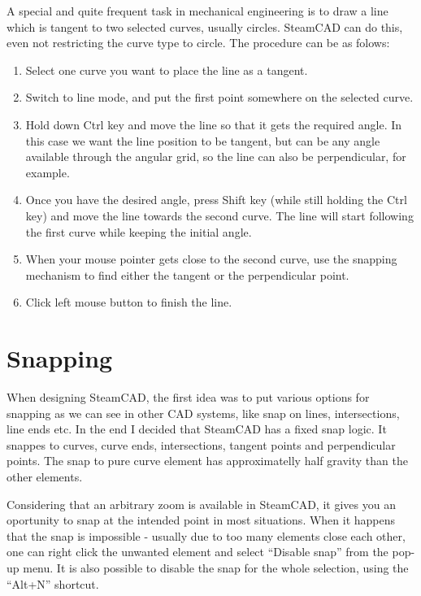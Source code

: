 A special and quite frequent task in mechanical engineering is to draw a line which is tangent
to two selected curves, usually circles. SteamCAD can do this, even not restricting the curve
type to circle. The procedure can be as folows:
\begin{enumerate}
\item Select one curve you want to place the line as a tangent.
\item Switch to line mode, and put the first point somewhere on the selected curve.
\item Hold down Ctrl key and move the line so that it gets the required angle. In this case
we want the line position to be tangent, but can be any angle available through the angular
grid, so the line can also be perpendicular, for example.
\item Once you have the desired angle, press Shift key (while still holding the Ctrl key)
and move the line towards the second curve. The line will start following the first curve
while keeping the initial angle.
\item When your mouse pointer gets close to the second curve, use the snapping mechanism
to find either the tangent or the perpendicular point.
\item Click left mouse button to finish the line.
\end{enumerate}

\section{Snapping}

When designing SteamCAD, the first idea was to put various options for snapping as we can
see in other CAD systems, like snap on lines, intersections, line ends etc. In the end
I decided that SteamCAD has a fixed snap logic. It snappes to curves, curve ends,
intersections, tangent points and perpendicular points. The snap to pure curve element has
approximatelly half gravity than the other elements.

Considering that an arbitrary zoom is available in SteamCAD, it gives you an oportunity
to snap at the intended point in most situations. When it happens that the snap is
impossible - usually due to too many elements close each other, one can right click the
unwanted element and select ``Disable snap'' from the pop-up menu. It is also possible to
disable the snap for the whole selection, using the ``Alt+N'' shortcut.

